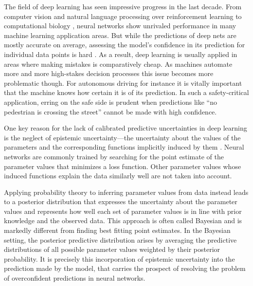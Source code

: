 \documentclass[../thesis.tex]{subfiles}
\begin{document}
The field of deep learning has seen impressive progress in the last decade. From computer vision \parencite{krizhevsky2012imagenet} and natural language processing \parencite{brown2020language} over reinforcement learning \parencite{mnih2015human} to computational biology \parencite{senior2020improved}, neural networks show unrivaled performance in many machine learning application areas. But while the predictions of deep nets are mostly accurate on average, assessing the model's confidence in its prediction for individual data points is hard \parencite{guo2017calibration}. As a result, deep learning is usually applied in areas where making mistakes is comparatively cheap. As machines automate more and more high-stakes decision processes this issue becomes more problematic though. For autonomous driving for instance it is vitally important that the machine knows how certain it is of its prediction. In such a safety-critical application, erring on the safe side is prudent when predictions like ``no pedestrian is crossing the street'' cannot be made with high confidence.

One key reason for the lack of calibrated predictive uncertainties in deep learning is the neglect of epistemic uncertainty---the uncertainty about the values of the parameters and the corresponding functions implicitly induced by them \parencite{wilson2020case}. Neural networks are commonly trained by searching for the point estimate of the parameter values that minimizes a loss function. Other parameter values whose induced functions explain the data similarly well are not taken into account. 

Applying probability theory to inferring parameter values from data instead leads to a posterior distribution that expresses the uncertainty about the parameter values and represents how well each set of parameter values is in line with prior knowledge and the observed data. This approach is often called Bayesian \parencite[p.~xxvii]{murphy2012machine} and is markedly different from finding best fitting point estimates. In the Bayesian setting, the posterior predictive distribution arises by averaging the predictive distributions of all possible parameter values weighted by their posterior probability. It is precisely this incorporation of epistemic uncertainty into the prediction made by the model, that carries the prospect of resolving the problem of overconfident predictions in neural networks.
\end{document}
